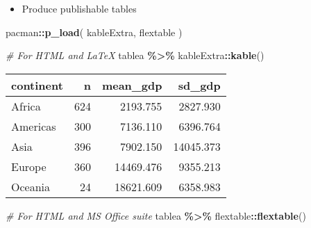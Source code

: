 \documentclass[
]{book}
\newenvironment{Shaded}{\begin{snugshade}}{\end{snugshade}}
\newcommand{\CommentTok}[1]{\textcolor[rgb]{0.56,0.35,0.01}{\textit{#1}}}
\newcommand{\KeywordTok}[1]{\textcolor[rgb]{0.13,0.29,0.53}{\textbf{#1}}}
\newcommand{\NormalTok}[1]{#1}
\newcommand{\OperatorTok}[1]{\textcolor[rgb]{0.81,0.36,0.00}{\textbf{#1}}}
\newcommand{\StringTok}[1]{\textcolor[rgb]{0.31,0.60,0.02}{#1}}
\providecommand{\tightlist}{%
  \setlength{\itemsep}{0pt}\setlength{\parskip}{0pt}}
\begin{document}
\begin{itemize}
\tightlist
\item
  Produce publishable tables
\end{itemize}

\begin{Shaded}
\begin{Highlighting}[]
\NormalTok{pacman}\OperatorTok{::}\KeywordTok{p\_load}\NormalTok{(}
\NormalTok{  kableExtra,}
\NormalTok{  flextable}
\NormalTok{)}

\CommentTok{\# For HTML and LaTeX}
\NormalTok{tablea }\OperatorTok{\%\textgreater{}\%}\StringTok{ }\NormalTok{kableExtra}\OperatorTok{::}\KeywordTok{kable}\NormalTok{()}
\end{Highlighting}
\end{Shaded}

\begin{tabular}{l|r|r|r}
\hline
continent & n & mean\_gdp & sd\_gdp\\
\hline
Africa & 624 & 2193.755 & 2827.930\\
\hline
Americas & 300 & 7136.110 & 6396.764\\
\hline
Asia & 396 & 7902.150 & 14045.373\\
\hline
Europe & 360 & 14469.476 & 9355.213\\
\hline
Oceania & 24 & 18621.609 & 6358.983\\
\hline
\end{tabular}

\begin{Shaded}
\begin{Highlighting}[]
\CommentTok{\# For HTML and MS Office suite}
\NormalTok{tablea }\OperatorTok{\%\textgreater{}\%}\StringTok{ }\NormalTok{flextable}\OperatorTok{::}\KeywordTok{flextable}\NormalTok{()}
\end{Highlighting}
\end{Shaded}

\providecommand{\docline}[3]{\noalign{\global\setlength{\arrayrulewidth}{#1}}\arrayrulecolor[HTML]{#2}\cline{#3}}

\setlength{\tabcolsep}{2pt}

\renewcommand*{\arraystretch}{1.5}
\end{document}
